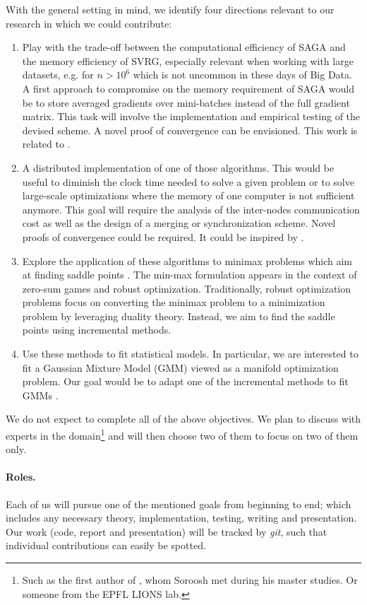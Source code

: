 \documentclass[a4paper,11pt]{article}
\begin{document}
With the general setting in mind, we identify four directions relevant to our
research in which we could contribute:
\begin{enumerate}
	\setlength{\itemsep}{0pt} \setlength{\parskip}{0pt}
	\item Play with the trade-off between the computational efficiency of SAGA
		and the memory efficiency of SVRG, especially relevant when working with
		large datasets, e.g. for $n > 10^6$ which is not uncommon in these days
		of Big Data. A first approach to compromise on the memory requirement of
		SAGA would be to store averaged gradients over mini-batches instead of
		the full gradient matrix. This task will involve the implementation and
		empirical testing of the devised scheme. A novel proof of convergence
		can be envisioned. This work is related to \cite{nitanda2014stochastic}.
	\item A distributed implementation of one of those algorithms. This would be
		useful to diminish the clock time needed to solve a given problem or to
		solve large-scale optimizations where the memory of one computer is not
		sufficient anymore. This goal will require the analysis of the
		inter-nodes communication cost as well as the design of a merging or
		synchronization scheme. Novel proofs of convergence could be required.
		It could be inspired by \cite{bianchi2014coordinate}.
	\item Explore the application of these algorithms to minimax problems which
		aim at finding saddle points \cite{nemirovski2009robust}. The min-max
		formulation appears in the context of zero-sum games and robust
		optimization. Traditionally, robust optimization problems focus on
		converting the minimax problem to a minimization problem by leveraging
		duality theory. Instead, we aim to find the saddle points using
		incremental methods.
	\item Use these methods to fit statistical models. In particular, we are
		interested to fit a Gaussian Mixture Model (GMM) viewed as a manifold
		optimization problem. Our goal would be to adapt one of the incremental
		methods to fit GMMs \cite{reshad_matrix_2015}.
\end{enumerate}
We do not expect to complete all of the above objectives. We plan to discuss
with experts in the domain\footnote{Such as the first author of
\cite{reshad_matrix_2015}, whom Soroosh met during his master studies. Or
someone from the EPFL LIONS lab.} and will then choose two of them to focus on two of them only.

\paragraph{Roles.}
Each of us will pursue one of the mentioned goals from beginning to end; which
includes any necessary theory, implementation, testing, writing and
presentation. Our work (code, report and presentation) will be tracked by
\textit{git}, such that individual contributions can easily be spotted.
\end{document}
